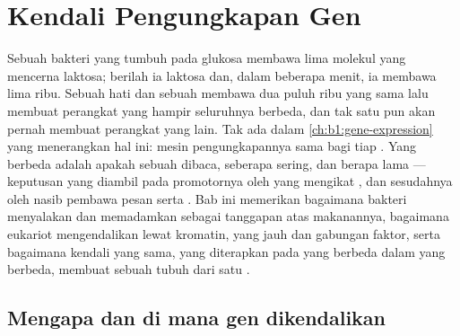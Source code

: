 \chapter{Kendali Pengungkapan Gen}\label{ch:b1:expression-control}

Sebuah bakteri yang tumbuh pada glukosa membawa lima molekul  yang
mencerna laktosa; berilah ia laktosa dan, dalam beberapa menit, ia
membawa lima ribu. Sebuah  hati dan sebuah  membawa dua puluh
ribu  yang sama lalu membuat perangkat  yang hampir seluruhnya
berbeda, dan tak satu pun akan pernah membuat perangkat yang lain. Tak
ada dalam \cref{ch:b1:gene-expression} yang menerangkan hal ini: mesin
pengungkapannya sama bagi tiap . Yang berbeda adalah apakah sebuah
 dibaca, seberapa sering, dan berapa lama --- keputusan yang diambil
pada promotornya oleh  yang mengikat , dan sesudahnya oleh
nasib pembawa pesan serta . Bab ini memerikan bagaimana
bakteri menyalakan dan memadamkan  sebagai tanggapan atas
makanannya, bagaimana eukariot mengendalikan  lewat kromatin,
 yang jauh dan gabungan faktor, serta bagaimana kendali yang
sama, yang diterapkan pada  yang berbeda dalam  yang berbeda,
membuat sebuah tubuh dari satu .

\section{Mengapa dan di mana gen dikendalikan}

